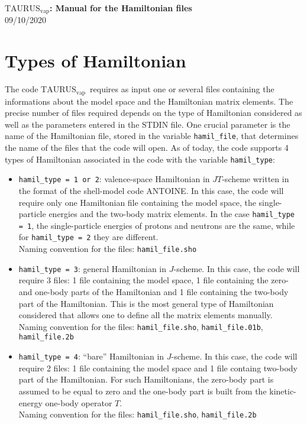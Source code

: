 \documentclass[a4paper,11pt]{article}
\newcommand{\TAURUSvap}{$\text{TAURUS}_{\text{vap}}$}
\newcommand{\TAURUSvapt}{$\text{TAURUS}_{\text{vap}}$~}
\renewcommand{\tt}[1]{\texttt{#1}}
\begin{document}
%
% 
\begin{center}
 {\LARGE \textbf{\TAURUSvap: Manual for the Hamiltonian files}} \\
 {\large 09/10/2020}
\end{center}

%
% 
\section{Types of Hamiltonian}

The code \TAURUSvapt requires as input one or several files containing the informations about the model space and the Hamiltonian matrix elements.
The precise number of files required depends on the type of Hamiltonian considered as well as the parameters entered in the STDIN file.
One crucial parameter is the name of the Hamiltonian file, stored in the variable \tt{hamil\_file}, that determines the name of the files that the code will open.
As of today, the code supports 4 types of Hamiltonian associated in the code with the variable \tt{hamil\_type}:

\begin{itemize}
  \item \tt{hamil\_type = 1 or 2}: valence-space Hamiltonian in $JT$-scheme written in the format of the shell-model code ANTOINE.
  In this case, the code will require only one Hamiltonian file containing the model space, the single-particle energies and the 
  two-body matrix elements. 
  In the case \tt{hamil\_type = 1}, the single-particle energies of protons and neutrons are the same, while for 
  \tt{hamil\_type = 2} they are different. \\
  Naming convention for the files: \tt{hamil\_file.sho}
  
  \item \tt{hamil\_type = 3}: general Hamiltonian in $J$-scheme. In this case, the code will require
  3 files: 1 file containing the model space, 1 file containing the zero- and one-body parts of the Hamiltonian and 1 file containing the
  two-body part of the Hamiltonian. This is the most general type of Hamiltonian considered that allows one to define all the matrix elements
  manually. \\
  Naming convention for the files: \tt{hamil\_file.sho}, \tt{hamil\_file.01b}, \tt{hamil\_file.2b} 

  \item \tt{hamil\_type = 4}: ``bare'' Hamiltonian in $J$-scheme. In this case, the code will require
  2 files: 1 file containing the model space and 1 file containg two-body part of the Hamiltonian. For such Hamiltonians, the zero-body part
  is assumed to be equal to zero and the one-body part is built from the kinetic-energy one-body operator $T$. \\
  Naming convention for the files: \tt{hamil\_file.sho}, \tt{hamil\_file.2b} 
  
\end{itemize}
\end{document}
